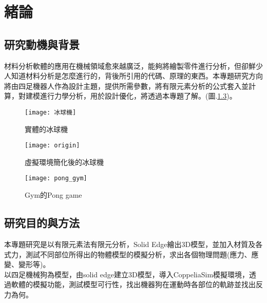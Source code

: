 \chapter{緒論}
\renewcommand{\baselinestretch}{10.0} %
\setcounter{page}{1}  %
\fontsize{14pt}{2.5pt}\sectionef

\section{研究動機與背景}
材料分析軟體的應用在機械領域愈來越廣泛，能夠將繪製零件進行分析，但卻鮮少人知道材料分析是怎麼進行的，背後所引用的代碼、原理的東西。本專題研究方向將由四足機器人作為設計主題，提供所需參數，將有限元素分析的公式套入並計算，對建模進行力學分析，用於設計優化，將透過本專題了解。(圖.\ref{fig.pong_gym})。\\

\begin{figure}[hbt!]
\begin{center}
\texttt{[image: 冰球機]}
\caption{\Large 實體的冰球機}\label{fig.冰球機}
\end{center}
\end{figure}

\begin{figure}[hbt!]
\begin{center}
\texttt{[image: origin]}
\caption{\Large 虛擬環境簡化後的冰球機}\label{fig.模擬冰球機}
\end{center}
\end{figure}

\begin{figure}[hbt!]
\begin{center}
\texttt{[image: pong\_gym]}
\caption{\Large Gym的Pong game}\label{fig.pong_gym}
\end{center}
\end{figure}

\section{研究目的與方法}
本專題研究是以有限元素法有限元分析，Solid Edge繪出3D模型，並加入材質及各式力，測試不同部位所得出的物體模型的模擬分析，求出各個物理問題(應力、應變、變形等)。\\

以四足機械狗為模型，由solid edge建立3D模型，導入CoppeliaSim模擬環境，透過軟體的模擬功能，測試模型可行性，找出機器狗在運動時各部位的軌跡並找出反力為何。\\

